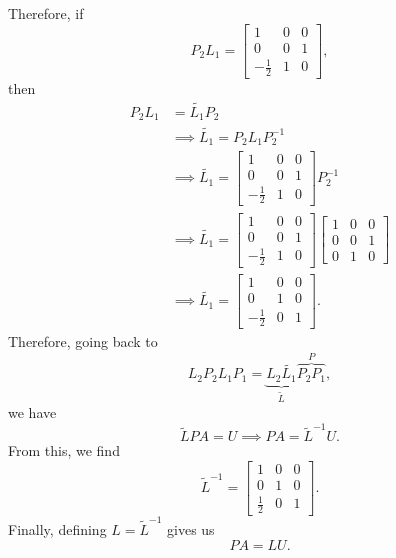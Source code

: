 \documentclass[letterpaper]{article}
\newcommand{\0}{\mathbf{0}}
\begin{document}
\begin{mdframed}
    Therefore, if \[P_2 L_1 = \begin{bmatrix}
        1 & 0 & 0 \\ 
        0 & 0 & 1 \\ 
        -\frac{1}{2} & 1 & 0
    \end{bmatrix},\] then
    \begin{equation*}
        \begin{aligned}
            P_2 L_1 &= \tilde{L_1} P_2 \\ 
                &\implies \tilde{L_1} = P_2 L_1 P_2^{-1} \\ 
                &\implies \tilde{L_1} = \begin{bmatrix}
                    1 & 0 & 0 \\ 
                    0 & 0 & 1 \\ 
                    -\frac{1}{2} & 1 & 0
                \end{bmatrix} P_2^{-1} \\ 
                &\implies \tilde{L_1} = \begin{bmatrix}
                    1 & 0 & 0 \\ 
                    0 & 0 & 1 \\ 
                    -\frac{1}{2} & 1 & 0
                \end{bmatrix} \begin{bmatrix}
                    1 & 0 & 0 \\ 
                    0 & 0 & 1 \\ 
                    0 & 1 & 0
                \end{bmatrix} \\ 
                &\implies \tilde{L_1} = \begin{bmatrix}
                    1 & 0 & 0 \\ 
                    0 & 1 & 0 \\ 
                    -\frac{1}{2} & 0 & 1
                \end{bmatrix}.
        \end{aligned}
    \end{equation*}
    Therefore, going back to 
    \[L_2 P_2 L_1 P_1 = \underbrace{L_2 \tilde{L_1}}_{\tilde{L}} \overbrace{P_2 P_1}^{P},\]
    we have 
    \[\tilde{L}PA = U \implies PA = \tilde{L}^{-1} U.\]
    From this, we find 
    \[\tilde{L}^{-1} = \begin{bmatrix}
        1 & 0 & 0 \\ 
        0 & 1 & 0 \\ 
        \frac{1}{2} & 0 & 1
    \end{bmatrix}.\]
    Finally, defining $L = \tilde{L}^{-1}$ gives us 
    \[PA = LU.\]
\end{mdframed}
\end{document}
